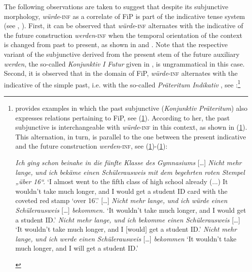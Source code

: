 \documentclass[output=paper,colorlinks,citecolor=brown]{langscibook}
\begin{document}
The following observations are taken to suggest that despite its subjunctive morphology, \textit{würde}-\textsc{inf} as a correlate of FiP is part of the indicative tense system (see \cite[136]{Petkov1991}, \cite[145–147]{Thieroff1992}). First, it can be observed that \textit{würde}-\textsc{inf} alternates with the indicative of the future construction \textit{werden}-\textsc{inf} when the temporal orientation of the context is changed from past to present, as shown in  and . Note that the respective variant of the subjunctive derived from the present stem of the future auxiliary \textit{werden}, the so-called \textit{Konjunktiv I Futur} given in , is ungrammatical in this case. Second, it is observed that in the domain of FiP, \textit{würde}-\textsc{inf} alternates with the indicative of the simple past, i.e. with the so-called \textit{Präteritum Indikativ} \citep[see also][306–307]{Welke2005}, see :\footnote{\citet[94]{FabriciusHansen2000} provides examples in which the past subjunctive (\textit{Konjunktiv Präteritum}) also expresses relations pertaining to FiP, see (\ref{i}). According to her, the past subjunctive is interchangeable with \textit{würde}-\textsc{inf} in this context, as shown in (\ref{ii}). This alternation, in turn, is parallel to the one between the present indicative and the future construction \textit{werden}-\textsc{inf}, see (\ref{iii})-(\ref{iv}):

\begin{exe}
    \ex \label{i} \textit{Ich ging schon beinahe in die fünfte Klasse des Gymnasiums} […] \textit{Nicht mehr lange, und ich bekäme einen Schülerausweis mit dem begehrten roten Stempel „über 16“.} `I almost went to the fifth class of high school already (...) It wouldn't take much longer, and I would get a student ID card with the coveted red stamp `over 16'.' […]
    \ex \label{ii} \textit{Nicht mehr lange, und ich würde einen Schülerausweis} […] \textit{bekommen.} `It wouldn't take much longer, and I would get a student ID.'
    \ex \label{iii} \textit{Nicht mehr lange, und ich bekomme einen Schülerausweis} […] `It wouldn't take much longer, and I [would] get a student ID.'
    \ex \label{iv} \textit{Nicht mehr lange, und ich werde einen Schülerausweis} […] \textit{bekommen} `It wouldn't take much longer, and I will get a student ID.'
\end{exe}
}

\end{document}
